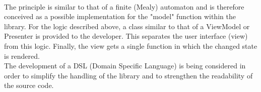 \\
The principle is similar to that of a finite (Mealy) automaton and is therefore conceived as a possible implementation for the "model" function within the library. 
For the logic described above, a class similar to that of a ViewModel or Presenter is provided to the developer. This separates the user interface (view) from this logic.
Finally, the view gets a single function in which the changed state is rendered.
\\
The development of a DSL (Domain Specific Language) is being considered in order to simplify the handling of the library and to strengthen the readability 
of the source code.


